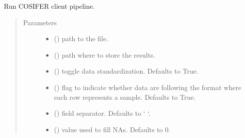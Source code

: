 \documentclass[letterpaper,10pt,english]{sphinxmanual}
\begin{document}
\begin{fulllineitems}
\label{\detokenize{_modules/cosifer.pipelines:cosifer.pipelines.pipeline_cli.run}}
Run COSIFER client pipeline.
\begin{quote}\begin{description}
\item[{Parameters}] \leavevmode\begin{itemize}
\item {} 
 () \textendash{} path to the file.

\item {} 
 () \textendash{} path where to store the results.

\item {} 
 (\sphinxstyleliteralemphasis{\sphinxupquote{, }}) \textendash{} toggle data standardization.
Defaults to True.

\item {} 
 (\sphinxstyleliteralemphasis{\sphinxupquote{, }}) \textendash{} flag to indicate whether data are
following the format where each row represents a sample.
Defaults to True.

\item {} 
 (\sphinxstyleliteralemphasis{\sphinxupquote{, }}) \textendash{} field separator. Defaults to ‘     ‘.

\item {} 
 (\sphinxstyleliteralemphasis{\sphinxupquote{, }}) \textendash{} value used to fill NAs. Defaults to 0.


\end{itemize}
\end{description}
\end{quote}
\end{fulllineitems}
\end{document}
